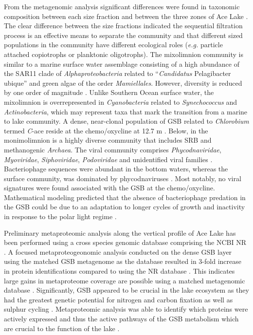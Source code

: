 From the metagenomic analysis significant differences were found in taxonomic composition between each size fraction and between the three zones of Ace Lake \cite{Lauro2011}.
The clear difference between the size fractions indicated the sequential filtration process is an effective means to separate the community and that different sized populations in the community have different ecological roles (\emph{e.g.} particle attached copiotrophs or planktonic oligotrophs).
The mixolimnion community is similar to a marine surface water assemblage consisting of a high abundance of the SAR11 clade of \emph{Alphaproteobacteria} related to ``\emph{Candidatus} Pelagibacter ubique'' and green algae of the order \emph{Mamiellales}.
However, diversity is reduced by one order of magnitude \cite{Lauro2011}.
Unlike Southern Ocean surface water, the mixolimnion is overrepresented in \emph{Cyanobacteria} related to \emph{Synechococcus} and \emph{Actinobacteria}, which may represent taxa that mark the transition from a marine to lake community.
A dense, near-clonal population of \acl{GSB} related to \emph{Chlorobium} termed \emph{C}-ace reside at the chemo/oxycline at 12.7 m \cite{Ng2010a, Lauro2011}.
Below, in the monimolimnion is a highly diverse community that includes \ac{SRB} and methanogenic \emph{Archaea}.
The viral community comprises \emph{Phycodnaviridae}, \emph{Myoviridae}, \emph{Siphoviridae}, \emph{Podoviridae} and unidentified viral families \cite{Lauro2011}. 
Bacteriophage sequences were abundant in the bottom waters, whereas the surface community, was dominated by phycodnaviruses \cite{Lauro2011}. 
Most notably, no viral signatures were found associated with the \ac{GSB} at the chemo/oxycline. 
Mathematical modeling predicted that the absence of bacteriophage predation in the \ac{GSB} could be due to an adaptation to longer cycles of growth and inactivity in response to the polar light regime \cite{Lauro2011}. 

Preliminary metaproteomic analysis along the vertical profile of Ace Lake has been performed using a cross species genomic database comprising the \ac{NCBI} \ac{NR} \cite{Ng2010b}.
A focused metaproteogeonomic analysis conducted on the dense \ac{GSB} layer using the matched \ac{GSB} metagenome as the database resulted in 3-fold increase in protein identifications compared to using the \ac{NR} database \cite{Ng2010b}.
This indicates large gains in metaproteome coverage are possible using a matched metagenomic database \cite{Ng2010b}.
Significantly, \ac{GSB} appeared to be crucial in the lake ecosystem as they had the greatest genetic potential for nitrogen and carbon fixation as well as sulphur cycling \cite{Ng2010b, Lauro2011}.
Metaproteomic analysis was able to identify which proteins were actively expressed and thus the active pathways of the \ac{GSB} metabolism which are crucial to the function of the lake \cite{Ng2010a}.

